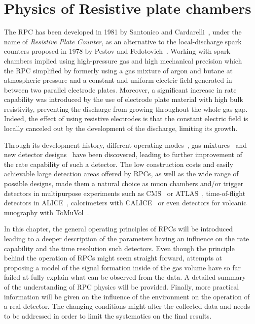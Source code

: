 \renewcommand\evenpagerightmark{{\scshape\small Chapter 3}}
\renewcommand\oddpageleftmark{{\scshape\small Amplification processes in gaseous detectors}}

\renewcommand{\bibname}{References}

\hyphenation{}

\chapter[Physics of Resistive plate chambers]%
{Physics of Resistive plate chambers}
\label{chapt3}

The \acf{RPC} has been developed in 1981 by Santonico and Cardarelli~\cite{SANTONICO81}, under the name of \textit{Resistive Plate Counter}, as an alternative to the local-discharge spark counters proposed in 1978 by Pestov and Fedotovich~\cite{PESTOV78,FEDOTOVICH82}. Working with spark chambers implied using high-pressure gas and high mechanical precision which the RPC simplified by formerly using a gas mixture of argon and butane at atmospheric pressure and a constant and uniform electric field generated in between two parallel electrode plates. Moreover, a significant increase in rate capability was introduced by the use of electrode plate material with high bulk resistivity, preventing the discharge from growing throughout the whole gas gap. Indeed, the effect of using resistive electrodes is that the constant electric field is locally canceled out by the development of the discharge, limiting its growth.
	
	Through its development history, different operating modes~\cite{CROTTY93,CROTTY94,CARDARELLI96}, gas mixtures~\cite{SANTONICO81,CARDARELLI93,CARDARELLI96,ABBRESCIA1997PERF,ABBRESCIA1997,CAMARRI98,ZEBALLOS98} and new detector designs~\cite{ZEBALLOS96MRPC,WILLIAMS98,CZYRKOWSKI98} have been discovered, leading to further improvement of the rate capability of such a detector. The low construction costs and easily achievable large detection areas offered by RPCs, as well as the wide range of possible designs, made them a natural choice as muon chambers and/or trigger detectors in multipurpose experiments such as CMS~\cite{MUONTDR} or ATLAS~\cite{ATLASTDR}, time-of-flight detectors in ALICE~\cite{ALICETDR}, calorimeters with CALICE~\cite{CALICE2016} or even detectors for volcanic muography with ToMuVol~\cite{TOMUVOL2011}.
	
	In this chapter, the general operating principles of RPCs will be introduced leading to a deeper description of the parameters having an influence on the rate capability and the time resolution such detectors. Even though the principle behind the operation of RPCs might seem straight forward, attempts at proposing a model of the signal formation inside of the gas volume have so far failed at fully explain what can be observed from the data. A detailed summary of the understanding of RPC physics will be provided. Finally, more practical information will be given on the influence of the environment on the operation of a real detector. The changing conditions might alter the collected data and needs to be addressed in order to limit the systematics on the final results.

